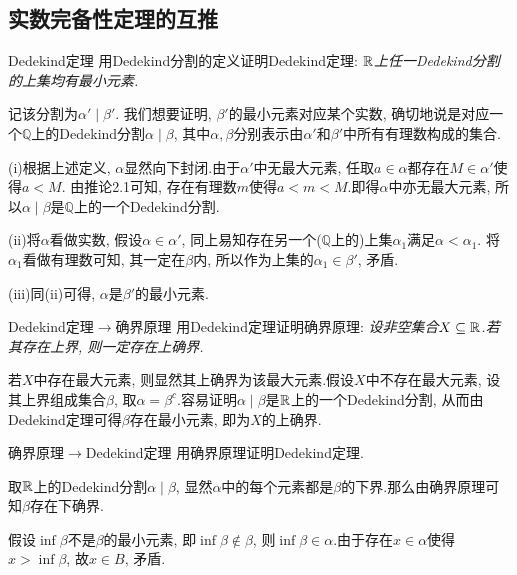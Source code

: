 \subsection{实数完备性定理的互推}

\begin{exercise}{Dedekind定理}
	用Dedekind分割的定义证明Dedekind定理: \textit{$\mathbb{R}$上任一Dedekind分割的上集均有最小元素. }
\end{exercise}
\begin{solution}
	记该分割为$\alpha ' \mid \beta '$. 我们想要证明, $\beta '$的最小元素对应某个实数, 确切地说是对应一个$\mathbb{Q}$上的Dedekind分割$\alpha \mid \beta$, 其中$\alpha , \beta$分别表示由$\alpha '$和$\beta '$中所有有理数构成的集合.
	
	(i)根据上述定义, $\alpha$显然向下封闭.由于$\alpha '$中无最大元素, 任取$a \in \alpha$都存在$M \in \alpha '$使得$a < M$. 由推论2.1可知, 存在有理数$m$使得$a<m<M$.即得$\alpha$中亦无最大元素, 所以$\alpha \mid \beta$是$\mathbb{Q}$上的一个Dedekind分割.
	
	(ii)将$\alpha$看做实数, 假设$\alpha \in \alpha '$, 同上易知存在另一个($\mathbb{Q}$上的)上集$\alpha _1$满足$\alpha < \alpha _1$. 将$\alpha _1$看做有理数可知, 其一定在$\beta$内, 所以作为上集的$\alpha _1 \in \beta '$, 矛盾.
	
	(iii)同(ii)可得, $\alpha$是$\beta '$的最小元素.
\end{solution}

\begin{exercise}{Dedekind定理$\to$确界原理}
	用Dedekind定理证明确界原理: \textit{设非空集合$X \subseteq \mathbb{R}$.若其存在上界, 则一定存在上确界. }
\end{exercise}
\begin{solution}
	若$X$中存在最大元素, 则显然其上确界为该最大元素.假设$X$中不存在最大元素, 设其上界组成集合$\beta$, 取$\alpha = \beta ^c$.容易证明$\alpha \mid \beta$是$\mathbb{R}$上的一个Dedekind分割, 从而由Dedekind定理可得$\beta$存在最小元素, 即为$X$的上确界.
\end{solution}

\begin{exercise}{确界原理$\to$Dedekind定理}
	用确界原理证明Dedekind定理. 
\end{exercise}
\begin{solution}
	取$\mathbb{R}$上的Dedekind分割$\alpha \mid \beta$, 显然$\alpha$中的每个元素都是$\beta$的下界.那么由确界原理可知$\beta$存在下确界.
	
	假设$\inf \beta$不是$\beta$的最小元素, 即$\inf \beta \notin \beta$, 则$\inf \beta \in \alpha$.由于存在$x \in \alpha$使得$x > \inf \beta$, 故$x \in B$, 矛盾. 
\end{solution}

